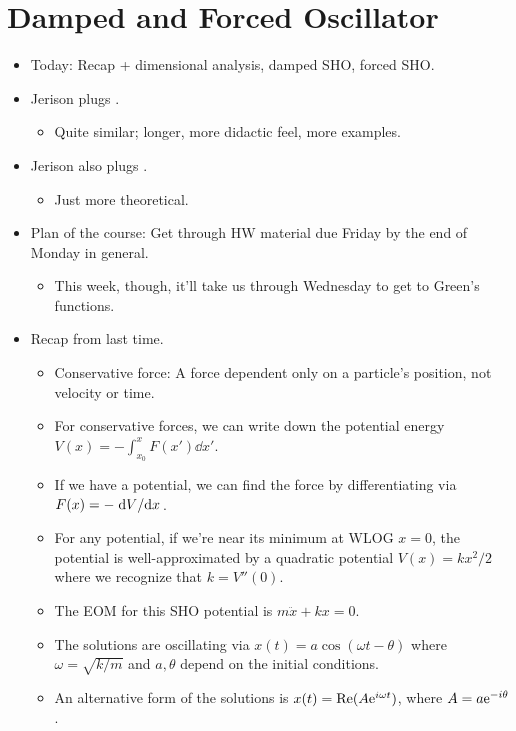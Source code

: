 \documentclass[../notes.tex]{subfiles}
\begin{document}
\section{Damped and Forced Oscillator}
\begin{itemize}
    \item {}Today: Recap + dimensional analysis, damped SHO, forced SHO.
    \item Jerison plugs \textcite{bib:ThorntonMarion}.
    \begin{itemize}
        \item Quite similar; longer, more didactic feel, more examples.
    \end{itemize}
    \item Jerison also plugs \textcite{bib:LandauLifshitz}.
    \begin{itemize}
        \item Just more theoretical.
    \end{itemize}
    \item Plan of the course: Get through HW material due Friday by the end of Monday in general.
    \begin{itemize}
        \item This week, though, it'll take us through Wednesday to get to Green's functions.
    \end{itemize}
    \item Recap from last time.
    \begin{itemize}
        \item Conservative force: A force dependent only on a particle's position, not velocity or time.
        \item For conservative forces, we can write down the potential energy $V(x)=-\int_{x_0}^xF(x')\dd{x'}$.
        \item If we have a potential, we can find the force by differentiating via $F(x)=-\dv*{V}{x}$.
        \item For any potential, if we're near its minimum at WLOG $x=0$, the potential is well-approximated by a quadratic potential $V(x)=kx^2/2$ where we recognize that $k=V''(0)$.
        \item The EOM for this SHO potential is $m\ddot{x}+kx=0$.
        \item The solutions are oscillating via $x(t)=a\cos(\omega t-\theta)$ where $\omega=\sqrt{k/m}$ and $a,\theta$ depend on the initial conditions.
        \item An alternative form of the solutions is $x(t)=\re(A\e[i\omega t])$, where $A=a\e[-i\theta]$.

\end{itemize}
\end{itemize}
\end{document}
